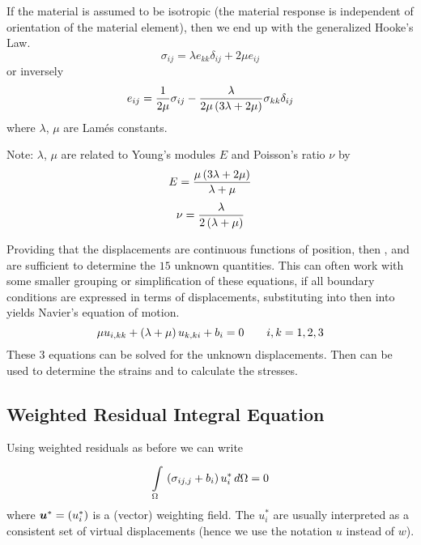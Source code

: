 If the material is assumed to be isotropic (\ie the material response is
independent of orientation of the material element), then we end up with the
generalized Hooke's Law.
\begin{equation}
  \sigma_{ij} = \lambda e_{kk} \delta_{ij} + 2 \mu e_{ij}
  \label{eqn:genHook}
\end{equation}
or inversely
\begin{displaymath}
  e_{ij} = \dfrac{1}{2 \mu} \sigma_{ij} - \dfrac{\lambda}{2 \mu \left( 3 \lambda 
    + 2 \mu \right)} \sigma_{kk} \delta_{ij}
\end{displaymath}
where $\lambda$, $\mu$ are Lam\'{e}s constants.

Note: $\lambda$, $\mu$ are related to Young's modules $E$ and Poisson's 
ratio $\nu$ by 
\begin{displaymath}
  E  =  \dfrac{\mu \left( 3 \lambda + 2 \mu \right)}{\lambda + \mu}
\end{displaymath}
\begin{displaymath}
  \nu = \dfrac{\lambda}{2\left( \lambda + \mu \right)}
\end{displaymath}   

Providing that the displacements are continuous functions of position, then
,  and  are sufficient
to determine the $15$ unknown quantities.  This can often work with some
smaller grouping or simplification of these equations, \eg if all boundary
conditions are expressed in terms of displacements, substituting
 into  then into 
yields Navier's equation of motion.
\begin{displaymath}
  \mu u_{i,kk} + \left( \lambda + \mu \right) u_{k,ki} + b_{i} = 0 \qquad i,k=1,2,3
\end{displaymath}
These $3$ equations can be solved for the unknown displacements. Then
 can be used to determine the strains and 
to calculate the stresses.


\subsection{Weighted Residual Integral Equation}
Using weighted residuals as before we can write
\begin{equation}
     \displaystyle\int\limits_{\Omega}^{} \,\left( \sigma_{ij,j} + b_{i} \right) u_{i}^{*}\,d\Omega   = 0
  \label{eqn:integral}
\end{equation}
where $\boldsymbol{u}^{*} = \left( u_{i}^{*} \right)$ is a (vector) weighting field.  The
$u_{i}^{*}$ are usually interpreted as a consistent set of virtual
displacements (hence we use the notation $u$ instead of $w$).

